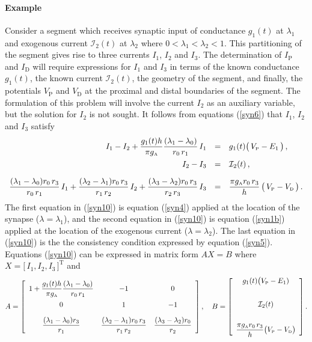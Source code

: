 \paragraph{Example}
Consider a segment which receives synaptic input of conductance
$g_1(t)$ at $\lambda_1$ and exogenous current $\mathcal{I}_2(t)$
at $\lambda_2$ where $0 < \lambda_1 < \lambda_2 < 1$. This
partitioning of the segment gives rise to three currents $I_1$,
$I_2$ and $I_3$. The determination of $I_\mathrm{P}$ and
$I_\mathrm{D}$ will require expressions for $I_1$ and $I_3$ in
terms of the known conductance $g_1(t)$, the known current
$\mathcal{I}_2(t)$, the geometry of the segment, and finally, the
potentials $V_\mathrm{P}$ and $V_\mathrm{D}$ at the proximal and
distal boundaries of the segment. The formulation of this problem
will involve the current $I_2$ as an auxiliary variable, but the
solution for $I_2$ is not sought. It follows from equations
(\ref{syn6}) that $I_1$, $I_2$ and $I_3$ satisfy
\begin{equation}\label{syn10}
\begin{array}{rcl}
I_1-I_2+\displaystyle\frac{g_1(t) h}{\pi
g_{\mbox{\tiny A}}}\frac{(\lambda_1-\lambda_0)}{r_0\,r_1}\,I_1 & = &
g_1(t)\big(\,V_{\mbox{\tiny P}}-E_1\,\big)\,,\\[10pt]
I_2-I_3 & = & \mathcal{I}_2(t)\,,\\[10pt]
\displaystyle\frac{(\lambda_1-\lambda_0)r_0\,r_3}{r_0\,r_1}\,I_1
+\frac{(\lambda_2-\lambda_1)r_0\,r_3}{r_1\,r_2}\,I_2+
\frac{(\lambda_3-\lambda_2)r_0\,r_3}{r_2\,r_3}\,I_3 & = &
\displaystyle\frac{\pi g_{\mbox{\tiny A}}r_0\,r_3}{h}\,\big(\,V_{\mbox{\tiny P}}-V_{\mbox{\tiny D}}\,\big)\,.
\end{array}
\end{equation}
The first equation in (\ref{syn10}) is equation (\ref{syn4})
applied at the location of the synapse ($\lambda=\lambda_1$), and
the second equation in (\ref{syn10}) is equation (\ref{syn1b})
applied at the location of the exogenous current
($\lambda=\lambda_2$). The last equation in (\ref{syn10}) is the
the consistency condition expressed by equation (\ref{syn5}).
Equations (\ref{syn10}) can be expressed in matrix form $AX=B$
where $X=\big[\,I_1,I_2,I_3\,\big]^\mathrm{T}$ and
\[
A=\left[\begin{array}{ccc}
1+\displaystyle\frac{g_1(t) h}{\pi g_{\mbox{\tiny A}}}\frac{(\lambda_1-\lambda_0)}
{r_0\,r_1} & -1 & 0 \\[10pt]
0 & 1 & -1 \\[10pt]
\displaystyle\frac{(\lambda_1-\lambda_0)r_3}{r_1}
& \displaystyle\frac{(\lambda_2-\lambda_1)r_0\,r_3}{r_1\,r_2}
& \displaystyle\frac{(\lambda_3-\lambda_2)r_0}{r_2}
\end{array}\right],\quad
B=\left[\begin{array}{c}
g_1(t)\big(V_{\mbox{\tiny P}}-E_1) \\[20pt]
\mathcal{I}_2(t) \\[20pt]
\displaystyle\frac{\pi g_{\mbox{\tiny A}}r_0\,r_3}{h}\big(V_{\mbox{\tiny P}}-V_{\mbox{\tiny D}}\big)
\end{array}\right].
\]
